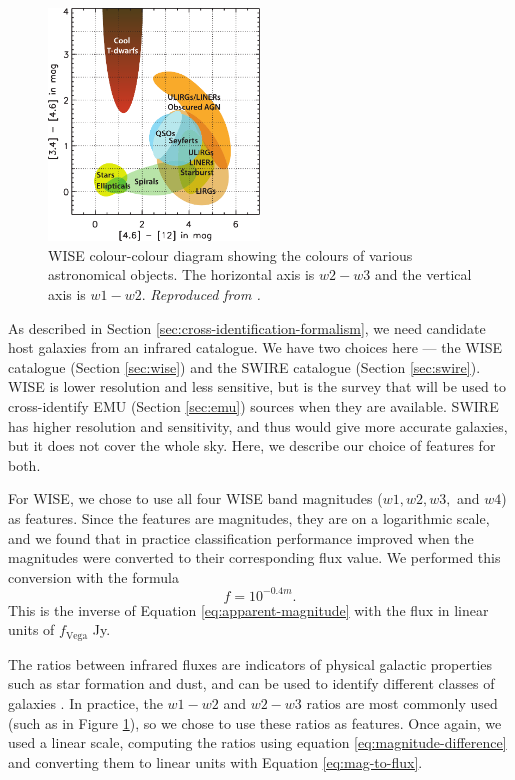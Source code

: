     \begin{figure}
      \centering
      \includegraphics[width=0.5\textwidth]{images/wise_colour-colour}
      \caption{WISE colour-colour diagram showing the colours of various
        astronomical objects. The horizontal axis is $w2 - w3$ and the vertical
        axis is $w1 - w2$. \emph{Reproduced from \citet{wright10}.}}
      \label{fig:wise-colour-colour}
    \end{figure}

    As described in Section \ref{sec:cross-identification-formalism}, we need
    candidate host galaxies from an infrared catalogue. We have two choices here
    --- the WISE catalogue (Section \ref{sec:wise}) and the SWIRE catalogue
    (Section \ref{sec:swire}). WISE is lower resolution and less sensitive, but
    is the survey that will be used to cross-identify EMU (Section
    \ref{sec:emu}) sources when they are available. SWIRE has higher
    resolution and sensitivity, and thus would give more accurate galaxies, but
    it does not cover the whole sky. Here, we describe our choice of features
    for both.

    For WISE, we chose to use all four WISE band magnitudes ($w1, w2, w3,$ and
    $w4$) as features. Since the features are magnitudes, they are on a
    logarithmic scale, and we found that in practice classification performance
    improved when the magnitudes were converted to their corresponding flux
    value. We performed this conversion with the formula
    \begin{equation}
      \label{eq:mag-to-flux}
      f = 10^{-0.4m}.
    \end{equation}
    This is the inverse of Equation \ref{eq:apparent-magnitude} with the flux in
    linear units of $f_{\text{Vega}}$ Jy.

    The ratios between infrared fluxes are indicators of physical galactic
    properties such as star formation and dust, and can be used to identify
    different classes of galaxies \citep{wright10}. In practice, the $w1 - w2$
    and $w2 - w3$ ratios are most commonly used (such as in Figure
    \ref{fig:wise-colour-colour}), so we chose to use these ratios as features.
    Once again, we used a linear scale, computing the ratios using equation
    \ref{eq:magnitude-difference} and converting them to linear units with
    Equation \ref{eq:mag-to-flux}.

